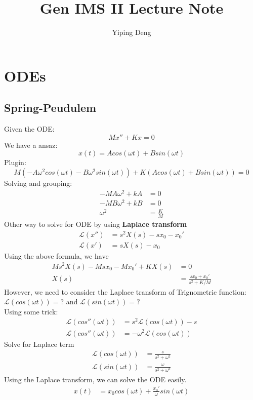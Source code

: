 \documentclass{article}
\newcommand{\Lcvy}{\mathcal{L}}
\begin{document}
\title{Gen IMS II Lecture Note}
\author{Yiping Deng}
\maketitle
\thispagestyle{fancy}
\section{ODEs}
\subsection{Spring-Peudulem}
Given the ODE:
$$ M x'' + Kx = 0 $$
We have a ansaz:
$$ x(t) = A cos(\omega t) + B sin(\omega t) $$
Plugin:
$$ M(-A \omega^2 cos(\omega t) - B \omega^2 sin(\omega t)) +
K(A cos(\omega t) + B sin(\omega t)) = 0 $$
Solving and grouping:
\begin{align*}
    - M A \omega^2 + k A &= 0 \\
    - M B \omega^2 + k B &= 0 \\
    \omega^2 &= \frac{K}{M}
\end{align*}
Other way to solve for ODE by using \textbf{Laplace transform}
\begin{align*}
    \Lcvy(x'') &= s^2 X(s) -sx_0 - x_0' \\
    \Lcvy(x') &= s X(s) - x_0
\end{align*}
Using the above formula, we have
\begin{align*}
    M s^2 X(s) - M s x_0 - M x_0' + KX(s) &= 0 \\
    X(s) &= \frac{sx_0 + x_0'}{s^2 + K / M}
\end{align*}
However, we need to consider the Laplace transform of Trignometric function:
$ \Lcvy(cos(\omega t)) = ? $ and $ \Lcvy(sin(\omega t)) = ? $ \\
Using some trick:
\begin{align*}
    \Lcvy(cos''(\omega t)) &= s^2 \Lcvy(cos(\omega t)) - s \\
    \Lcvy(cos''(\omega t)) &= - \omega^2 \Lcvy(cos(\omega t))
\end{align*}
Solve for Laplace term
\begin{align*}
    \Lcvy(cos(\omega t)) &= \frac{s}{s^2 + \omega^2} \\
    \Lcvy(sin(\omega t)) &= \frac{\omega}{s^2 + \omega^2}
\end{align*}
Using the Laplace transform, we can solve the ODE easily.
\begin{align*}
    x(t) &= x_0 cos(\omega t) + \frac{x_0'}{\omega} sin(\omega t)
\end{align*}
\end{document}
